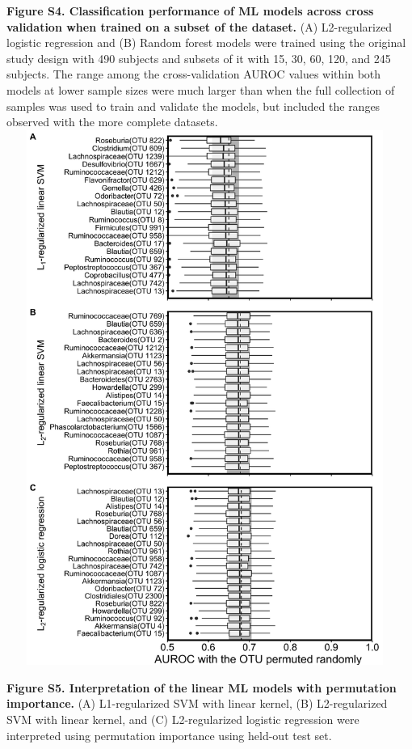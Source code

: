 \documentclass[11pt,]{article}
\begin{document}
\textbf{Figure S4. Classification performance of ML models across cross
validation when trained on a subset of the dataset.} (A) L2-regularized
logistic regression and (B) Random forest models were trained using the
original study design with 490 subjects and subsets of it with 15, 30,
60, 120, and 245 subjects. The range among the cross-validation AUROC
values within both models at lower sample sizes were much larger than
when the full collection of samples was used to train and validate the
models, but included the ranges observed with the more complete
datasets. \newpage
\includegraphics[height=17.5cm, width=13cm]{Figure_S5.png}

\textbf{Figure S5. Interpretation of the linear ML models with
permutation importance.} (A) L1-regularized SVM with linear kernel, (B)
L2-regularized SVM with linear kernel, and (C) L2-regularized logistic
regression were interpreted using permutation importance using held-out
test set.

\newpage
\end{document}
